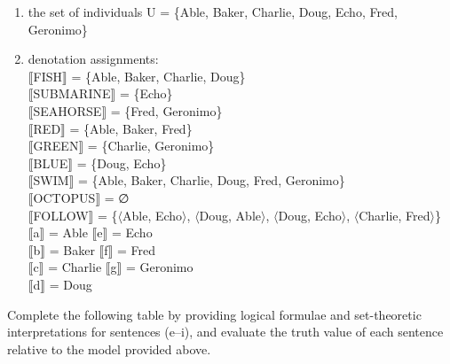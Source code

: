     \z
\begin{enumerate}
\item the set of individuals U = \{Able, Baker, Charlie, Doug, Echo, Fred, Geronimo\}
\item denotation assignments\textsc{:\\
{}$\llbracket$}\textsc{FISH}$\rrbracket$  = \{Able, Baker, Charlie, Doug\}\\
\textsc{$\llbracket$}SUBMARINE$\rrbracket$  = \{Echo\}\\
\textsc{$\llbracket$}SEAHORSE$\rrbracket$  = \{Fred, Geronimo\}\\
\textsc{$\llbracket$}RED$\rrbracket$  = \{Able, Baker, Fred\}\\
\textsc{$\llbracket$}GREEN$\rrbracket$  = \{Charlie, Geronimo\}\\
\textsc{$\llbracket$}BLUE$\rrbracket$  = \{Doug, Echo\}\\
\textsc{$\llbracket$}SWIM$\rrbracket$  = \{Able, Baker, Charlie, Doug, Fred, Geronimo\}\\
\textsc{$\llbracket$}OCTOPUS$\rrbracket$  = ∅\\
{}$\llbracket$FOLLOW$\rrbracket$  = \{$\langle$Able, Echo$\rangle$, $\langle$Doug, Able$\rangle$, $\langle$Doug, Echo$\rangle$, $\langle$Charlie, Fred$\rangle$\}\\
\textsc{$\llbracket$}a$\rrbracket$  = Able  \textsc{$\llbracket$}e$\rrbracket$  = Echo\\
\textsc{$\llbracket$}b$\rrbracket$  = Baker  \textsc{$\llbracket$}f$\rrbracket$  = Fred\\
\textsc{$\llbracket$}c$\rrbracket$  = Charlie  \textsc{$\llbracket$}g$\rrbracket$  = Geronimo\\
\textsc{$\llbracket$}d$\rrbracket$  = Doug
\end{enumerate}

\ea \label{ex:13.}%
    \label{ex:key:2} 
          Complete the following table by providing logical formulae and set-theoretic interpretations for sentences (e–i), and evaluate the truth value of each sentence relative to the model provided above.
    \z 

